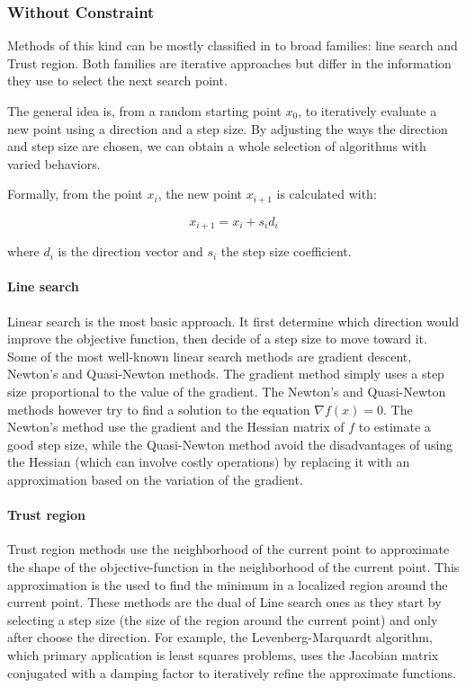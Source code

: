 \subsubsection{Without Constraint}

Methods of this kind can be mostly classified in to broad families: line search and Trust region.
Both families are iterative approaches but differ in the information they use to select the next search point.

The general idea is, from a random starting point $x_0$, to iteratively evaluate a new point using a direction and a step size.
By adjusting the ways the direction and step size are chosen, we can obtain a whole selection of algorithms with varied behaviors.

Formally, from the point $x_i$, the new point $x_{i+1}$ is calculated with:

\[ x_{i+1} = x_i +s_id_i \]

where $d_i$ is the direction vector and $s_i$ the step size coefficient.

\paragraph{Line search}

Linear search is the most basic approach. It first determine  which direction would improve the objective function, then decide of a step size to move toward it.
Some of the most well-known linear search methods are gradient descent, Newton's and Quasi-Newton methods. The gradient method simply uses a step size proportional to the value of the gradient. The Newton's and Quasi-Newton methods however try to find a solution to the equation $\nabla f(x)=0$. The Newton's method use the gradient  and the Hessian matrix of $f$ to estimate a good step size, while the Quasi-Newton method avoid the disadvantages of using the Hessian (which can involve costly operations) by replacing it with an approximation based on the variation of the gradient.

\paragraph{Trust region}

Trust region methods use the neighborhood of the current point to approximate the shape of the objective-function in the neighborhood of the current point. This approximation is the used to find the minimum in a localized region around the current point. These methods are the dual of Line search ones as they start by selecting a step size (the size of the region around the current point) and only after choose the direction.
For example, the Levenberg-Marquardt algorithm, which primary application is least squares problems, uses the Jacobian matrix conjugated with a damping factor to iteratively refine the approximate functions.

